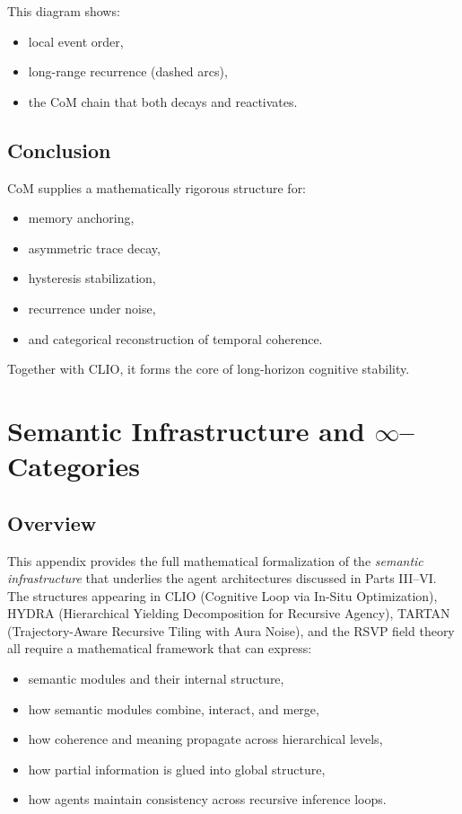 \documentclass[12pt,oneside]{book}
\theoremstyle{plain}
\theoremstyle{definition}
\begin{document}
This diagram shows:

\begin{itemize}
    \item local event order,
    \item long-range recurrence (dashed arcs),
    \item the CoM chain that both decays and reactivates.
\end{itemize}

\section{Conclusion}

CoM supplies a mathematically rigorous structure for:

\begin{itemize}
    \item memory anchoring,
    \item asymmetric trace decay,
    \item hysteresis stabilization,
    \item recurrence under noise,
    \item and categorical reconstruction of temporal coherence.
\end{itemize}

Together with CLIO, it forms the core of long-horizon cognitive stability.

\chapter{Semantic Infrastructure and $\infty$--Categories}
\label{app:semantic_infrastructure}

\section{Overview}

This appendix provides the full mathematical formalization of the \emph{semantic infrastructure} that underlies the agent architectures
discussed in Parts III–VI. The structures appearing in CLIO (Cognitive Loop via In-Situ Optimization), HYDRA (Hierarchical Yielding Decomposition
for Recursive Agency), TARTAN (Trajectory-Aware Recursive Tiling with Aura Noise), and the RSVP field theory all require a mathematical
framework that can express:

\begin{itemize}
  \item semantic modules and their internal structure,
  \item how semantic modules combine, interact, and merge,
  \item how coherence and meaning propagate across hierarchical levels,
  \item how partial information is glued into global structure,
  \item how agents maintain consistency across recursive inference loops.
\end{itemize}
\end{document}
